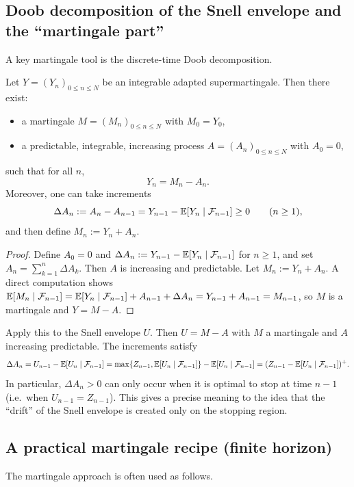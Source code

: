 \subsection{Doob decomposition of the Snell envelope and the ``martingale part''}

A key martingale tool is the discrete-time Doob decomposition.

\begin{theorem}\label{thm:doob_decomposition}
Let $Y=(Y_n)_{0\le n\le N}$ be an integrable adapted supermartingale. Then there exist:
\begin{itemize}
\item a martingale $M=(M_n)_{0\le n\le N}$ with $M_0=Y_0$,
\item a predictable, integrable, increasing process $A=(A_n)_{0\le n\le N}$ with $A_0=0$,
\end{itemize}
such that for all $n$,
\[
Y_n = M_n - A_n.
\]
Moreover, one can take increments
\[
\Delta A_n := A_n-A_{n-1} = Y_{n-1}-\mathbb{E}[Y_n\mid\mathcal{F}_{n-1}] \ge 0 \qquad (n\ge 1),
\]
and then define $M_n:=Y_n + A_n$.
\end{theorem}

\begin{proof}
Define $A_0=0$ and $\Delta A_n:=Y_{n-1}-\mathbb{E}[Y_n\mid\mathcal{F}_{n-1}]$ for $n\ge 1$, and set
$A_n=\sum_{k=1}^n \Delta A_k$. Then $A$ is increasing and predictable.
Let $M_n:=Y_n+A_n$. A direct computation shows
$\mathbb{E}[M_n\mid \mathcal{F}_{n-1}]=\mathbb{E}[Y_n\mid \mathcal{F}_{n-1}]+A_{n-1}+\Delta A_n=Y_{n-1}+A_{n-1}=M_{n-1}$,
so $M$ is a martingale and $Y=M-A$.
\end{proof}

Apply this to the Snell envelope $U$. Then $U=M-A$ with $M$ a martingale and $A$ increasing predictable.
The increments satisfy
\[
\Delta A_n = U_{n-1}-\mathbb{E}[U_n\mid\mathcal{F}_{n-1}]
= \max\{Z_{n-1},\mathbb{E}[U_n\mid\mathcal{F}_{n-1}]\} - \mathbb{E}[U_n\mid\mathcal{F}_{n-1}]
= (Z_{n-1}-\mathbb{E}[U_n\mid\mathcal{F}_{n-1}])^+.
\]
In particular, $\Delta A_n>0$ can only occur when it is optimal to stop at time $n-1$ (i.e.\ when
$U_{n-1}=Z_{n-1}$). This gives a precise meaning to the idea that the ``drift'' of the Snell envelope
is created only on the stopping region.

\subsection{A practical martingale recipe (finite horizon)}

The martingale approach is often used as follows.

